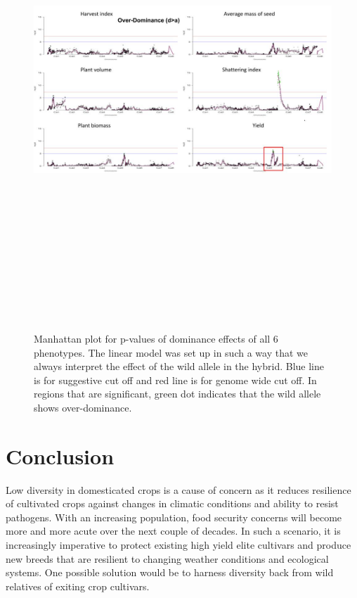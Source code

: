 \begin{figure}
    \centering
    \includegraphics[height=18cm, width=15cm]{tex/chickpea/manhattan-over.jpg}
    \caption{Manhattan plot for p-values of dominance effects of all 6 phenotypes. The linear model was set up in such a way that we always interpret the effect of the wild allele in the hybrid. Blue line is for suggestive cut off and red line is for genome wide cut off. In regions that are significant, green dot indicates that the wild allele shows over-dominance.}
    \label{fig:man-over}
\end{figure}

\section{Conclusion}

Low diversity in domesticated crops is a cause of concern as it reduces resilience of cultivated crops against changes in climatic conditions and ability to resist pathogens. With an increasing population, food security concerns will become more and more acute over the next couple of decades. In such a scenario, it is increasingly imperative to protect existing high yield elite cultivars and produce new breeds that are resilient to changing weather conditions and ecological systems. One possible solution would be to harness diversity back from wild relatives of exiting crop cultivars. 


